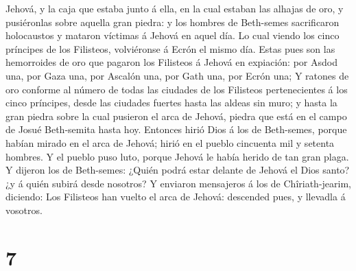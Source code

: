 Jehová, y la caja que estaba junto á ella, en la cual estaban las
alhajas de oro, y pusiéronlas sobre aquella gran piedra: y los hombres
de Beth-semes sacrificaron holocaustos y mataron víctimas á Jehová en
aquel día.  Lo cual viendo los cinco príncipes de los
Filisteos, volviéronse á Ecrón el mismo día.  Estas pues
son las hemorroides de oro que pagaron los Filisteos á Jehová en
expiación: por Asdod una, por Gaza una, por Ascalón una, por Gath una,
por Ecrón una;  Y ratones de oro conforme al número de
todas las ciudades de los Filisteos pertenecientes á los cinco
príncipes, desde las ciudades fuertes hasta las aldeas sin muro; y hasta
la gran piedra sobre la cual pusieron el arca de Jehová, piedra que está
en el campo de Josué Beth-semita hasta hoy.  Entonces
hirió Dios á los de Beth-semes, porque habían mirado en el arca de
Jehová; hirió en el pueblo cincuenta mil y setenta hombres. Y el pueblo
puso luto, porque Jehová le había herido de tan gran plaga.
 Y dijeron los de Beth-semes: ¿Quién podrá estar delante
de Jehová el Dios santo? ¿y á quién subirá desde nosotros?
 Y enviaron mensajeros á los de Chîriath-jearim,
diciendo: Los Filisteos han vuelto el arca de Jehová: descended pues, y
llevadla á vosotros.

\hypertarget{section-6}{%
\section{7}\label{section-6}}

